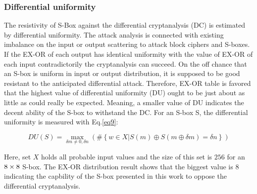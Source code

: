 \documentclass[journal]{IEEEtran/IEEEtran}
\begin{document}
\begin{table}
	\centering
	\caption{Nonlinearities of Boolean functions of optimized S-box.}
	\label{tab2}
\end{table}


\subsubsection{Differential uniformity}

The resistivity of S-Box against the differential cryptanalysis (DC) is estimated by differential uniformity. The attack analysis is connected with existing imbalance on the input or output scattering to attack block ciphers and S-boxes. If the EX-OR of each output has identical uniformity with the value of EX-OR of each input contradictorily the cryptanalysis can succeed. On the off chance that an S-box is uniform in input or output distribution, it is supposed to be good resistant to the anticipated differential attack. Therefore, EX-OR table is favored that the highest value of differential uniformity (DU) ought to be just about as little as could really be expected. Meaning, a smaller value of DU indicates the decent ability of the S-box to withstand the DC. For an S-box S, the differential uniformity is measured with Eq.\ref{eq9}: 



\begin{equation}\label{eq9}
DU(S) = \mathop {\max }\limits_{\delta m \ne 0,\delta n} \left( {\# \left\{ {w \in X|S(m) \oplus S(m \oplus \delta m) = \delta n} \right\}} \right) 
\end{equation}

Here, set $X$ holds all probable input values and the size of this set is $256$ for an ${\rm{8 \times 8}}$ S-box. The EX-OR distribution result shows that the biggest value is 8 indicating the capbility of the S-box presented in this work to oppose the differential cryptanalysis.

 
\end{document}
